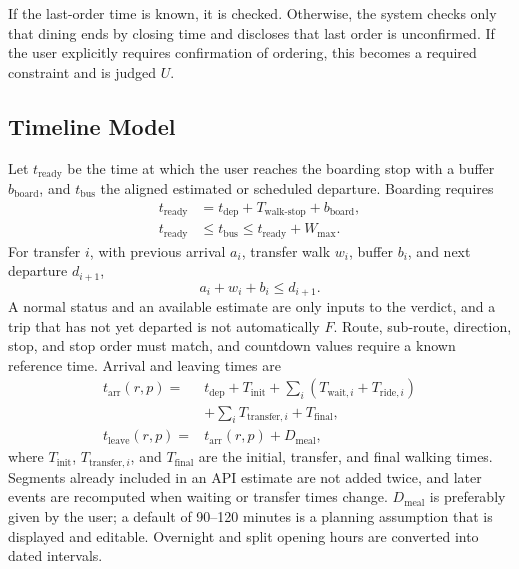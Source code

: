 \documentclass[conference]{IEEEtran}
\begin{document}
If the last-order time is known, it is checked. Otherwise, the system checks only that dining ends by closing time and discloses that last order is unconfirmed. If the user explicitly requires confirmation of ordering, this becomes a required constraint and is judged $U$.

\subsection{Timeline Model}
Let $t_{\mathrm{ready}}$ be the time at which the user reaches the boarding stop with a buffer $b_{\mathrm{board}}$, and $t_{\mathrm{bus}}$ the aligned estimated or scheduled departure. Boarding requires
\begin{equation}
\begin{aligned}
t_{\mathrm{ready}}&=t_{\mathrm{dep}}+T_{\mathrm{walk\text{-}stop}}+b_{\mathrm{board}},\\
t_{\mathrm{ready}}&\le t_{\mathrm{bus}}\le t_{\mathrm{ready}}+W_{\max}.
\end{aligned}
\label{eq:boarding}
\end{equation}
For transfer $i$, with previous arrival $a_i$, transfer walk $w_i$, buffer $b_i$, and next departure $d_{i+1}$,
\begin{equation}
a_i+w_i+b_i\le d_{i+1}.
\label{eq:transfer}
\end{equation}
A normal status and an available estimate are only inputs to the verdict, and a trip that has not yet departed is not automatically $F$. Route, sub-route, direction, stop, and stop order must match, and countdown values require a known reference time. Arrival and leaving times are
\begin{equation}
\begin{aligned}
t_{\mathrm{arr}}(r,p)={}&t_{\mathrm{dep}}+T_{\mathrm{init}}+\sum_i\left(T_{\mathrm{wait},i}+T_{\mathrm{ride},i}\right)\\
&+\sum_i T_{\mathrm{transfer},i}+T_{\mathrm{final}},\\
t_{\mathrm{leave}}(r,p)={}&t_{\mathrm{arr}}(r,p)+D_{\mathrm{meal}},
\end{aligned}
\label{eq:timeline}
\end{equation}
where $T_{\mathrm{init}}$, $T_{\mathrm{transfer},i}$, and $T_{\mathrm{final}}$ are the initial, transfer, and final walking times. Segments already included in an API estimate are not added twice, and later events are recomputed when waiting or transfer times change. $D_{\mathrm{meal}}$ is preferably given by the user; a default of 90--120 minutes is a planning assumption that is displayed and editable. Overnight and split opening hours are converted into dated intervals.
\end{document}
